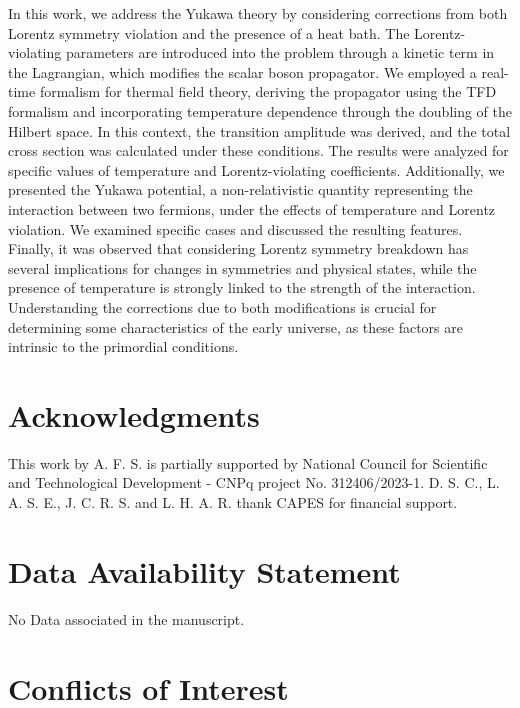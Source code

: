\documentclass[11pt,showpacs,preprintnumbers,amsmath,amssymb,prd,nofootinbib,superscriptaddress]{revtex4-2}
\begin{document}
{In this work, we address the Yukawa theory by considering corrections from both Lorentz symmetry violation and the presence of a heat bath. The Lorentz-violating parameters are introduced into the problem through a kinetic term in the Lagrangian, which modifies the scalar boson propagator. We employed a real-time formalism for thermal field theory, deriving the propagator using the TFD formalism and incorporating temperature dependence through the doubling of the Hilbert space. In this context, the transition amplitude was derived, and the total cross section was calculated under these conditions. The results were analyzed for specific values of temperature and Lorentz-violating coefficients. Additionally, we presented the Yukawa potential, a non-relativistic quantity representing the interaction between two fermions, under the effects of temperature and Lorentz violation. We examined specific cases and discussed the resulting features. Finally, it was observed that considering Lorentz symmetry breakdown has several implications for changes in symmetries and physical states, while the presence of temperature is strongly linked to the strength of the interaction. Understanding the corrections due to both modifications is crucial for determining some characteristics of the early universe, as these factors are intrinsic to the primordial conditions.

\section*{Acknowledgments}

This work by A. F. S. is partially supported by National Council for Scientific and Technological
Development - CNPq project No. 312406/2023-1. D. S. C., L. A. S. E., J. C. R. S. and L. H. A. R. thank CAPES for financial support.


\section*{Data Availability Statement}

No Data associated in the manuscript.

\section*{Conflicts of Interest}

}
\end{document}
